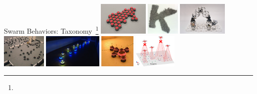 \documentclass[presentation, 9pt]{beamer}\mode<presentation>{\usetheme{AMSBolognaFC}}
\begin{document}
\begin{frame}{Swarm Behaviors: Taxonomy~\footnote{}}
	\centering
	\includegraphics[height=1.6cm]{img/aggregation.jpg}
	\includegraphics[height=1.6cm]{img/pattern-formation.png}
	\includegraphics[height=1.6cm]{img/sefl-assembly.jpg}
	\\
	\centering
	\includegraphics[height=1.6cm]{img/exploration.jpg}
	\includegraphics[height=1.6cm]{img/navigation.jpg}
	\includegraphics[height=1.6cm]{img/transportation.jpeg}
	\includegraphics[height=1.6cm]{img/localization.png}

\end{frame}
\end{document}
